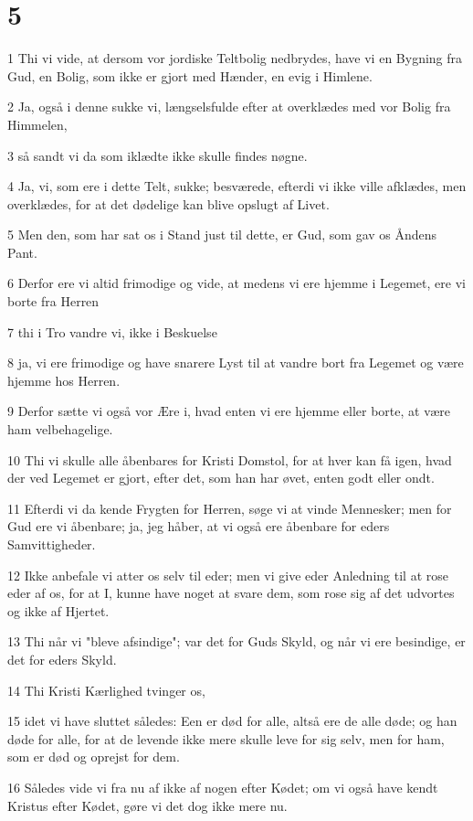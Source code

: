 \chapter{5}

\par 1 Thi vi vide, at dersom vor jordiske Teltbolig nedbrydes, have vi en Bygning fra Gud, en Bolig, som ikke er gjort med Hænder, en evig i Himlene.
\par 2 Ja, også i denne sukke vi, længselsfulde efter at overklædes med vor Bolig fra Himmelen,
\par 3 så sandt vi da som iklædte ikke skulle findes nøgne.
\par 4 Ja, vi, som ere i dette Telt, sukke; besværede, efterdi vi ikke ville afklædes, men overklædes, for at det dødelige kan blive opslugt af Livet.
\par 5 Men den, som har sat os i Stand just til dette, er Gud, som gav os Åndens Pant.
\par 6 Derfor ere vi altid frimodige og vide, at medens vi ere hjemme i Legemet, ere vi borte fra Herren
\par 7 thi i Tro vandre vi, ikke i Beskuelse
\par 8 ja, vi ere frimodige og have snarere Lyst til at vandre bort fra Legemet og være hjemme hos Herren.
\par 9 Derfor sætte vi også vor Ære i, hvad enten vi ere hjemme eller borte, at være ham velbehagelige.
\par 10 Thi vi skulle alle åbenbares for Kristi Domstol, for at hver kan få igen, hvad der ved Legemet er gjort, efter det, som han har øvet, enten godt eller ondt.
\par 11 Efterdi vi da kende Frygten for Herren, søge vi at vinde Mennesker; men for Gud ere vi åbenbare; ja, jeg håber, at vi også ere åbenbare for eders Samvittigheder.
\par 12 Ikke anbefale vi atter os selv til eder; men vi give eder Anledning til at rose eder af os, for at I, kunne have noget at svare dem, som rose sig af det udvortes og ikke af Hjertet.
\par 13 Thi når vi "bleve afsindige"; var det for Guds Skyld, og når vi ere besindige, er det for eders Skyld.
\par 14 Thi Kristi Kærlighed tvinger os,
\par 15 idet vi have sluttet således: Een er død for alle, altså ere de alle døde; og han døde for alle, for at de levende ikke mere skulle leve for sig selv, men for ham, som er død og oprejst for dem.
\par 16 Således vide vi fra nu af ikke af nogen efter Kødet; om vi også have kendt Kristus efter Kødet, gøre vi det dog ikke mere nu.
